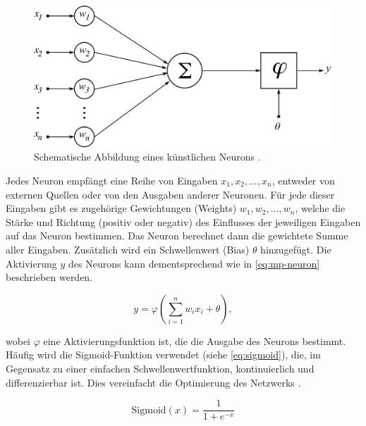 \begin{figure}[h]
	\centering
	\vspace*{4mm}
	\includegraphics[width=12cm]{figure_mp-neuron_nd_edited1.png}
	\vspace*{2mm}
	\caption[Schematische Abbildung eines künstlichen Neurons.]{Schematische Abbildung eines künstlichen Neurons \parencite{WikiNeuronModel}.}
	\label{fig:neuron}
\end{figure}

Jedes Neuron empfängt eine Reihe von Eingaben $x_1, x_2, \dots, x_n$, entweder von externen Quellen oder von den Ausgaben anderer Neuronen. Für jede dieser Eingaben gibt es zugehörige Gewichtungen (Weights) $w_1, w_2, \dots, w_n$, welche die Stärke und Richtung (positiv oder negativ) des Einflusses der jeweiligen Eingaben auf das Neuron bestimmen. Das Neuron berechnet dann die gewichtete Summe aller Eingaben. Zusätzlich wird ein Schwellenwert (Bias) $\theta$ hinzugefügt. Die Aktivierung $y$ des Neurons kann dementsprechend wie in \autoref{eq:mp-neuron} beschrieben werden.

\begin{equation}
	y = \varphi \left( \sum_{i=1}^{n} w_{i} x_i + \theta \right),
	\label{eq:mp-neuron}
\end{equation}

wobei $\varphi$ eine Aktivierungsfunktion ist, die die Ausgabe des Neurons bestimmt. Häufig wird die Sigmoid-Funktion verwendet (siehe \autoref{eq:sigmoid}), die, im Gegensatz zu einer einfachen Schwellenwertfunktion, kontinuierlich und differenzierbar ist. Dies vereinfacht die Optimierung des Netzwerks \parencite{Zhou2021machinelearning}.

\begin{equation}
	\text{Sigmoid}(x) = \frac{1}{1 + e^{-x}}
	\label{eq:sigmoid}
\end{equation}

